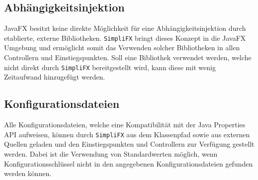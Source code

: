 \subsection{Abhängigkeitsinjektion}
JavaFX besitzt keine direkte Möglichkeit für eine Abhängigkeitsinjektion durch etablierte, externe Bibliotheken. \texttt{SimpliFX} bringt dieses Konzept in die JavaFX Umgebung und ermöglicht somit das Verwenden solcher Bibliotheken in allen Controllern und Einstiegspunkten. Soll eine Bibliothek verwendet werden, welche nicht direkt durch \texttt{SimpliFX} bereitgestellt wird, kann diese mit wenig Zeitaufwand hinzugefügt werden.
\subsection{Konfigurationsdateien}
Alle Konfigurationsdateien, welche eine Kompatibilität mit der Java Properties API aufweisen, können durch \texttt{SimpliFX} aus dem Klassenpfad sowie aus externen Quellen geladen und den Einstiegspunkten und Controllern zur Verfügung gestellt werden. Dabei ist die Verwendung von Standardwerten möglich, wenn Konfigurationsschlüssel nicht in den angegebenen Konfigurationsdateien gefunden werden können.